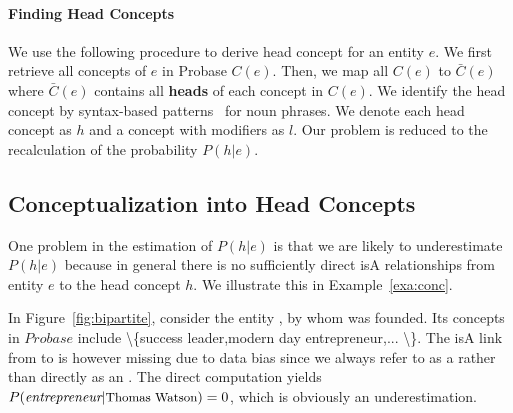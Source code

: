 \paragraph*{Finding Head Concepts}
We use the following procedure to derive head concept for an entity $e$.
We first retrieve all concepts of $e$ in Probase $C(e)$.
Then, we map all $C(e)$ to $\bar{C}(e)$ where $\bar{C}(e)$ contains all {\bf heads} of each concept in $C(e)$.
We identify the head concept by syntax-based patterns~\cite{ponzetto2007deriving} for noun phrases.
We denote each head concept as $h$ and a concept with modifiers as ${l}$.
Our problem is reduced to the recalculation of the probability $P({h}|e)$.


\subsection{Conceptualization into Head Concepts}
One problem in the estimation of $P(h|e)$ is that we are likely to underestimate $P(h|e)$ because in general there is no sufficiently direct isA relationships from entity $e$ to the head concept $h$.
We illustrate this in Example~\ref{exa:conc}.





{\footnotesize
\begin{example}[Underestimation]
\label{exa:conc}
In Figure~\ref{fig:bipartite}, consider the entity , by whom  was founded. 
Its concepts in $Probase$ include \ac{\{success leader,modern day entrepreneur,... \}}. 
The isA link from  to  is however missing due to data bias since we always refer to  as a  rather than directly as an . 
The direct computation yields $P(\ac{entrepreneur}|\at{\text{Thomas Watson}})=0$, which is obviously an underestimation.
\end{example}
}


